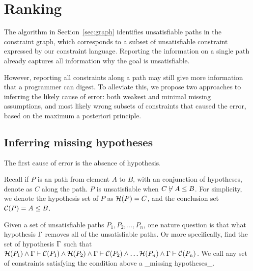 % 
% 
% 
% 
% 
% 
\section{Ranking}
\label{sec:ranking}

The algorithm in Section~\ref{sec:graph} identifies unsatisfiable paths in the
constraint graph, which corresponds to a subset of unsatisfiable constraint
expressed by our constraint language. Reporting the information on a single
path already captures all information why the goal is unsatisfiable.

However, reporting all constraints along a path may still give more
information that a programmer can digest. To alleviate this, we
propose two approaches to inferring the likely cause of error: both
weakest and minimal missing assumptions, and most likely wrong subsets
of constraints that caused the error, based on the maximum a posteriori
principle.
 
\subsection{Inferring missing hypotheses}
\label{sec:assumptions}

The first cause of error is the absence of hypothesis.

Recall if $P$ is an path from element $A$ to $B$, with an conjunction
of hypotheses, denote as $C$ along the path. $P$ is unsatisfiable when
$C\not\vdash A\leq B$. For simplicity, we denote the hypothesis set
of $P$ as $\mathcal{H}(P)=C$, and the conclusion set
$\mathcal{C}(P)=A\leq B$.

Given a set of unsatisfiable paths $P_1, P_2, \dots,  P_n$, one nature
question is that what hypothesis $\Gamma$ removes all of the unsatisfiable
paths. Or more specifically, find the set of hypothesis $\Gamma$ such that 
%
$\mathcal{H}(P_1) \land \Gamma \vdash \mathcal{C}(P_1) \land
\mathcal{H}(P_2) \land \Gamma \vdash \mathcal{C}(P_2) \land \dots
\mathcal{H}(P_n) \land \Gamma \vdash \mathcal{C}(P_n)$.
%
We call any set of constraints satisfying the condition above a
_missing hypotheses_.

